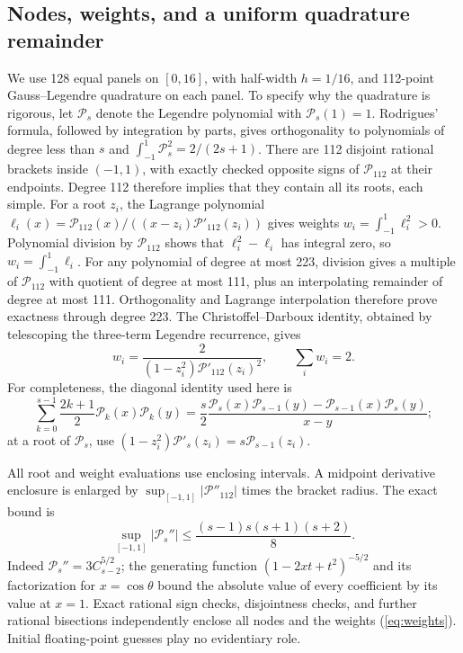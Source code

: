 \documentclass[11pt]{article}
\theoremstyle{definition}\newtheorem{definition}[theorem]{Definition}
\begin{document}
\subsection{Nodes, weights, and a uniform quadrature remainder}
We use 128 equal panels on $[0,16]$, with half-width $h=1/16$, and
112-point Gauss--Legendre quadrature on each panel. To specify why the
quadrature is rigorous, let $\mathcal P_s$ denote the Legendre polynomial
with $\mathcal P_s(1)=1$. Rodrigues' formula, followed by integration by
parts, gives orthogonality to polynomials of degree less than $s$ and
$\int_{-1}^1\mathcal P_s^2=2/(2s+1)$. There are 112 disjoint rational
brackets inside $(-1,1)$, with exactly checked opposite signs of
$\mathcal P_{112}$ at their endpoints. Degree 112 therefore implies
that they contain all its roots, each simple. For a root $z_i$, the
Lagrange polynomial
$\ell_i(x)=\mathcal P_{112}(x)/((x-z_i)\mathcal P'_{112}(z_i))$
gives weights $w_i=\int_{-1}^1\ell_i^2>0$. Polynomial division by
$\mathcal P_{112}$ shows that $\ell_i^2-\ell_i$ has integral zero,
so $w_i=\int_{-1}^1\ell_i$. For any polynomial of degree at most 223,
division gives a multiple of $\mathcal P_{112}$ with quotient of degree
at most 111, plus an interpolating remainder of degree at most 111.
Orthogonality and Lagrange interpolation therefore prove exactness
through degree 223. The
Christoffel--Darboux identity, obtained by telescoping the three-term
Legendre recurrence, gives
\begin{equation}\label{eq:weights}
 w_i=\frac{2}{(1-z_i^2)\mathcal P'_{112}(z_i)^2},\qquad
 \sum_iw_i=2.
\end{equation}
For completeness, the diagonal identity used here is
\[
 \sum_{k=0}^{s-1}\frac{2k+1}{2}\mathcal P_k(x)\mathcal P_k(y)
 =\frac{s}{2}\frac{\mathcal P_s(x)\mathcal P_{s-1}(y)
                         -\mathcal P_{s-1}(x)\mathcal P_s(y)}{x-y};
\]
at a root of $\mathcal P_s$, use
$(1-z_i^2)\mathcal P'_s(z_i)=s\mathcal P_{s-1}(z_i)$.

All root and weight evaluations use enclosing intervals. A midpoint
derivative enclosure is enlarged by
$\sup_{[-1,1]}|\mathcal P''_{112}|$ times the bracket radius. The exact
bound is
\[
 \sup_{[-1,1]}|\mathcal P_s''|
 \leq\frac{(s-1)s(s+1)(s+2)}8.
\]
Indeed $\mathcal P_s''=3C_{s-2}^{5/2}$; the generating function
$(1-2xt+t^2)^{-5/2}$ and its factorization for $x=\cos\theta$ bound
the absolute value of every coefficient by its value at $x=1$.
Exact rational sign checks, disjointness checks, and further rational
bisections independently enclose all nodes and the weights
(\ref{eq:weights}). Initial floating-point guesses play no evidentiary role.
\end{document}

